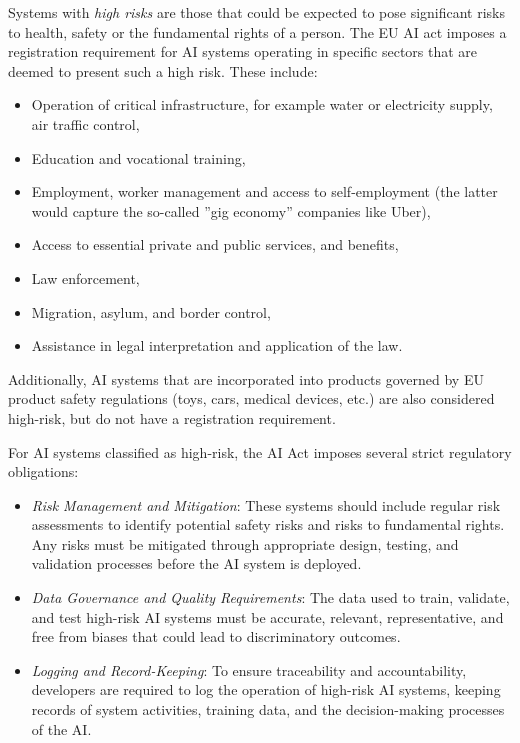 \begin{advanced}
Systems with \emph{high risks} are those that could be expected to pose significant risks to health, safety or the fundamental rights of a person. The EU AI act imposes a registration requirement for AI systems operating in specific sectors that are deemed to present such a high risk. These include: 
\begin{itemize}
  \item Operation of critical infrastructure, for example water or electricity supply, air traffic control,
  \item Education and vocational training,
  \item Employment, worker management and access to self-employment (the latter would capture the so-called ''gig economy'' companies like Uber),
  \item Access to essential private and public services, and benefits,
  \item Law enforcement,
  \item Migration, asylum, and border control,
  \item Assistance in legal interpretation and application of the law.
\end{itemize}

Additionally, AI systems that are incorporated into products governed by EU product safety regulations (toys, cars, medical devices, etc.) are also considered high-risk, but do not have a registration requirement.

For AI systems classified as high-risk, the AI Act imposes several strict regulatory obligations:
\begin{itemize}
  \item \emph{Risk Management and Mitigation}: These systems should include regular risk assessments to identify potential safety risks and risks to fundamental rights. Any risks must be mitigated through appropriate design, testing, and validation processes before the AI system is deployed.

  \item \emph{Data Governance and Quality Requirements}: The data used to train, validate, and test high-risk AI systems must be accurate, relevant, representative, and free from biases that could lead to discriminatory outcomes.

  \item \emph{Logging and Record-Keeping}: To ensure traceability and accountability, developers are required to log the operation of high-risk AI systems, keeping records of system activities, training data, and the decision-making processes of the AI. 


\end{itemize}
\end{advanced}
